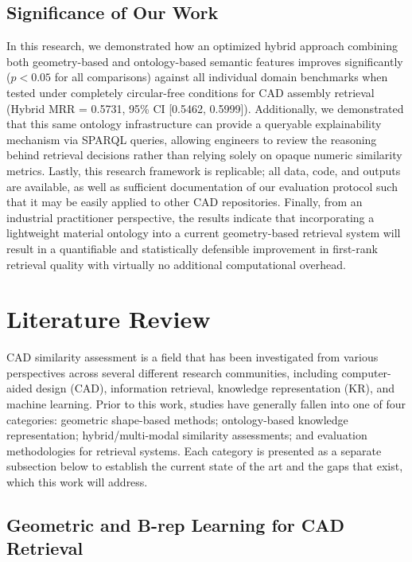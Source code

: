 \documentclass[preprint,12pt]{elsarticle}
\begin{document}
\subsection{Significance of Our Work}

In this research, we demonstrated how an optimized hybrid approach combining both geometry-based and ontology-based semantic features improves significantly ($p < 0.05$ for all comparisons) against all individual domain benchmarks when tested under completely circular-free conditions for CAD assembly retrieval (Hybrid MRR = 0.5731, 95\% CI [0.5462, 0.5999]).
Additionally, we demonstrated that this same ontology infrastructure can provide a queryable explainability mechanism via SPARQL queries, allowing engineers to review the reasoning behind retrieval decisions rather than relying solely on opaque numeric similarity metrics.
Lastly, this research framework is replicable; all data, code, and outputs are available, as well as sufficient documentation of our evaluation protocol such that it may be easily applied to other CAD repositories.
Finally, from an industrial practitioner perspective, the results indicate that incorporating a lightweight material ontology into a current geometry-based retrieval system will result in a quantifiable and statistically defensible improvement in first-rank retrieval quality with virtually no additional computational overhead.


\section{Literature Review}

CAD similarity assessment is a field that has been investigated from various perspectives across several different research communities, including computer-aided design (CAD), information retrieval, knowledge representation (KR), and machine learning.
Prior to this work, studies have generally fallen into one of four categories: geometric shape-based methods; ontology-based knowledge representation; hybrid/multi-modal similarity assessments; and evaluation methodologies for retrieval systems.
Each category is presented as a separate subsection below to establish the current state of the art and the gaps that exist, which this work will address.

\subsection{Geometric and B-rep Learning for CAD Retrieval}
\end{document}
